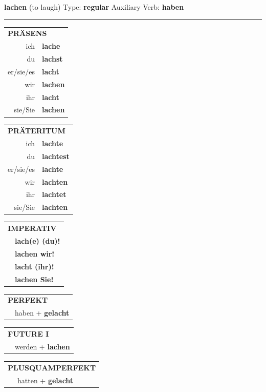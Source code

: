 \documentclass[10pt,a4paper]{revtex4-2}
\begin{document}
\begin{verbbox}
{\Large \bf lachen} (to laugh) \hfill Type: \textbf{regular} \hfill Auxiliary Verb: \textbf{haben} 

\vspace{5pt}
\hrule
\vspace{5pt}

\begin{tabular}{rl}
\multicolumn{2}{l}{\textbf{PRÄSENS}}\\
ich & \textbf{lache}\\
du & \textbf{lachst}\\
er/sie/es & \textbf{lacht}\\
wir & \textbf{lachen}\\
ihr & \textbf{lacht}\\
sie/Sie & \textbf{lachen}\\
\end{tabular}
\hfill
\begin{tabular}{rl}
\multicolumn{2}{l}{\textbf{PRÄTERITUM}}\\
ich & \textbf{lachte}\\
du & \textbf{lachtest}\\
er/sie/es & \textbf{lachte}\\
wir & \textbf{lachten}\\
ihr & \textbf{lachtet}\\
sie/Sie & \textbf{lachten}\\
\end{tabular}
\hfill
\begin{tabular}{rl}
\multicolumn{2}{l}{\textbf{IMPERATIV}}\\
& \textbf{lach(e) (du)!}\\
& \textbf{lachen wir!}\\
& \textbf{lacht (ihr)!}\\
& \textbf{lachen Sie!}\\
\end{tabular}

\vspace{10pt}

\begin{tabular}{rl}
\multicolumn{2}{l}{\textbf{PERFEKT}}\\
& haben + \textbf{gelacht}\\
\end{tabular}
\hfill
\begin{tabular}{rl}
\multicolumn{2}{l}{\textbf{FUTURE I}}\\
& werden + \textbf{lachen}\\
\end{tabular}
\hfill
\begin{tabular}{rl}
\multicolumn{2}{l}{\textbf{PLUSQUAMPERFEKT}}\\
& hatten + \textbf{gelacht}\\
\end{tabular}


\end{verbbox}
\end{document}
